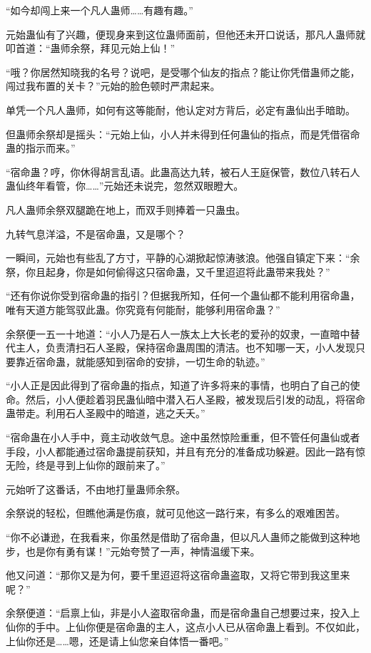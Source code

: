 \begin{this_body}
“如今却闯上来一个凡人蛊师……有趣有趣。”

元始蛊仙有了兴趣，便现身来到这位蛊师面前，但他还未开口说话，那凡人蛊师就叩首道：“蛊师余祭，拜见元始上仙！”

“哦？你居然知晓我的名号？说吧，是受哪个仙友的指点？能让你凭借蛊师之能，闯过我布置的关卡？”元始的脸色顿时严肃起来。

单凭一个凡人蛊师，如何有这等能耐，他认定对方背后，必定有蛊仙出手暗助。

但蛊师余祭却是摇头：“元始上仙，小人并未得到任何蛊仙的指点，而是凭借宿命蛊的指示而来。”

“宿命蛊？哼，你休得胡言乱语。此蛊高达九转，被石人王庭保管，数位八转石人蛊仙终年看管，你……”元始还未说完，忽然双眼瞪大。

凡人蛊师余祭双腿跪在地上，而双手则捧着一只蛊虫。

九转气息洋溢，不是宿命蛊，又是哪个？

一瞬间，元始也有些乱了方寸，平静的心湖掀起惊涛骇浪。他强自镇定下来：“余祭，你且起身，你是如何偷得这只宿命蛊，又千里迢迢将此蛊带来我处？”

“还有你说你受到宿命蛊的指引？但据我所知，任何一个蛊仙都不能利用宿命蛊，唯有天道方能驾驭此蛊。你究竟有何能耐，能够利用宿命蛊？”

余祭便一五一十地道：“小人乃是石人一族太上大长老的爱孙的奴隶，一直暗中替代主人，负责清扫石人圣殿，保持宿命蛊周围的清洁。也不知哪一天，小人发现只要靠近宿命蛊，就能感知到宿命的安排，一切生命的轨迹。”

“小人正是因此得到了宿命蛊的指点，知道了许多将来的事情，也明白了自己的使命。然后，小人便趁着羽民蛊仙暗中潜入石人圣殿，被发现后引发的动乱，将宿命蛊带走。利用石人圣殿中的暗道，逃之夭夭。”

“宿命蛊在小人手中，竟主动收敛气息。途中虽然惊险重重，但不管任何蛊仙或者手段，小人都能通过宿命蛊提前获知，并且有充分的准备成功躲避。因此一路有惊无险，终是寻到上仙你的跟前来了。”

元始听了这番话，不由地打量蛊师余祭。

余祭说的轻松，但瞧他满是伤痕，就可见他这一路行来，有多么的艰难困苦。

“你不必谦逊，在我看来，你虽然是借助了宿命蛊，但以凡人蛊师之能做到这种地步，也是你有勇有谋！”元始夸赞了一声，神情温缓下来。

他又问道：“那你又是为何，要千里迢迢将这宿命蛊盗取，又将它带到我这里来呢？”

余祭便道：“启禀上仙，非是小人盗取宿命蛊，而是宿命蛊自己想要过来，投入上仙你的手中。上仙你便是宿命蛊的主人，这点小人已从宿命蛊上看到。不仅如此，上仙你还是……嗯，还是请上仙您亲自体悟一番吧。”


\end{this_body}
